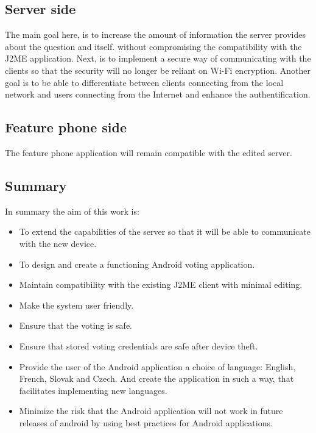\documentclass[11pt,twoside,a4paper]{book}
\begin{document}
\subsection{Server side}
The main goal here, is to increase the amount of information the server provides about the question and itself. without compromising the compatibility with the J2ME application. Next, is to implement a secure way of communicating with the clients so that the security will no longer be reliant on Wi-Fi encryption. Another goal is to be able to differentiate between clients connecting from the local network and users connecting from the Internet and enhance the authentification.




\subsection{Feature phone side}
The feature phone application will remain compatible with the edited server. \\

\subsection{Summary}
In summary the aim of this work is:

\begin{itemize}
\item To extend the capabilities of the server so that it will be able to communicate with the new device.
\item To design and create a functioning Android voting application.
\item Maintain compatibility with the existing J2ME client with minimal editing.
\item Make the system user friendly.
\item Ensure that the voting is safe.
\item Ensure that stored voting credentials are safe after device theft.
\item Provide the user of the Android application a choice of language: English, French, Slovak and Czech. And create the application in such a way, that facilitates implementing new languages.
\item Minimize the risk that the Android application will not work in future releases of android by using best practices for Android applications.
\end{itemize}
\end{document}
